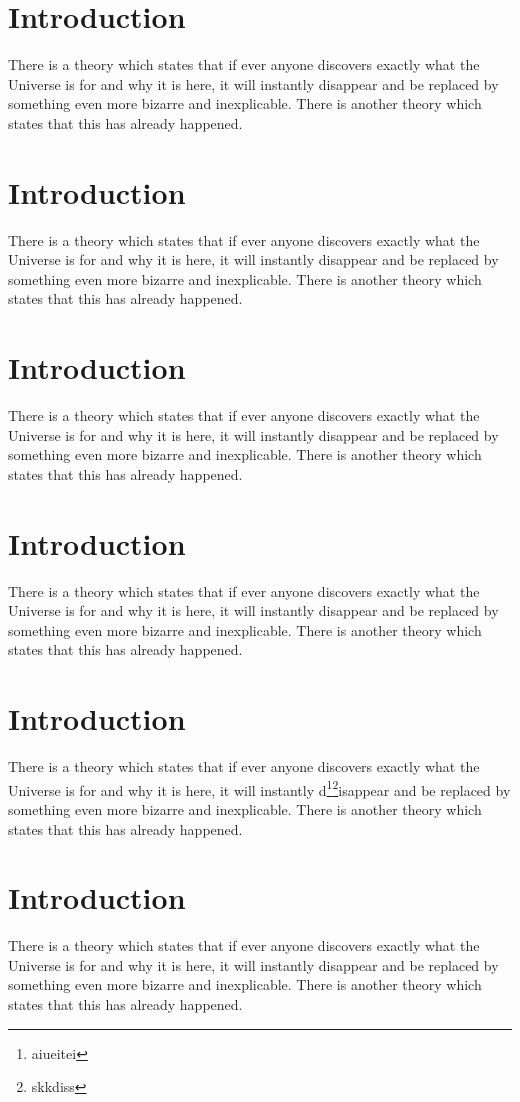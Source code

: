 \documentclass[a4paper,10pt,twoside,uplatex,dvipdfmx]{jsarticle}
\begin{document}
\section{Introduction}
There is a theory which states that if ever anyone discovers exactly what the Universe is for and why it is here, it will instantly disappear and be replaced by something even more bizarre and inexplicable.
There is another theory which states that this has already happened.

\section{Introduction}
There is a theory which states that if ever anyone discovers exactly what the Universe is for and why it is here, it will instantly disappear and be replaced by something even more bizarre and inexplicable.
There is another theory which states that this has already happened.

\section{Introduction}
There is a theory which states that if ever anyone discovers exactly what the Universe is for and why it is here, it will instantly disappear and be replaced by something even more bizarre and inexplicable.
There is another theory which states that this has already happened.

\section{Introduction}
There is a theory which states that if ever anyone discovers exactly what the Universe is for and why it is here, it will instantly disappear and be replaced by something even more bizarre and inexplicable.
There is another theory which states that this has already happened.

\section{Introduction}
There is a theory which states that if ever anyone discovers exactly what the Universe is for and why it is here, it will instantly d\footnote{aiueitei}\footnote{skkdiss}isappear and be replaced by something even more bizarre and inexplicable.
There is another theory which states that this has already happened.

\section{Introduction}
There is a theory which states that if ever anyone discovers exactly what the Universe is for and why it is here, it will instantly disappear and be replaced by something even more bizarre and inexplicable.
There is another theory which states that this has already happened.
\end{document}
